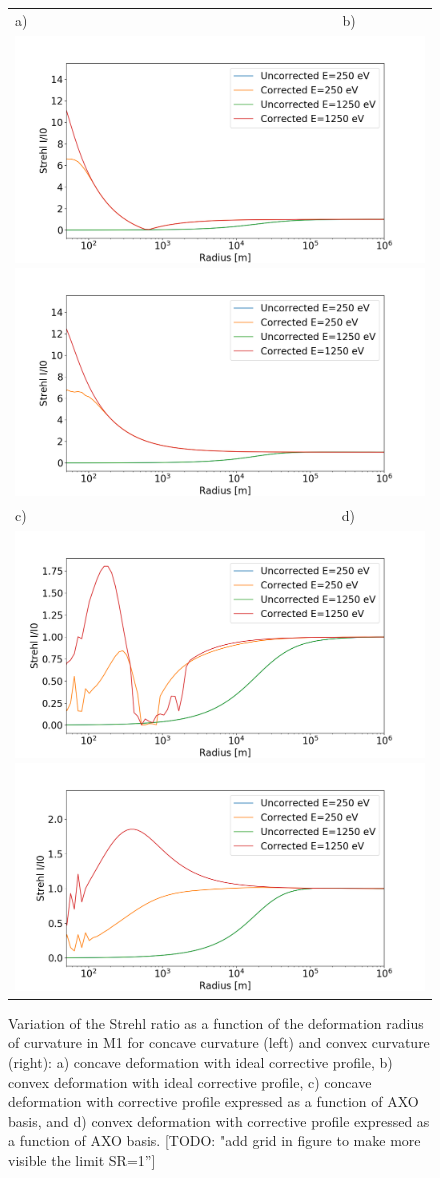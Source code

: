 \documentclass{iucr}              %
\newcommand{\todo}[1]{{\color{red}[TODO: "#1'']}}
\begin{document}
  \begin{figure}
  \begin{center}
  \begin{tabular}{l} 
  a)~~~~~~~~~~~~~~~~~~~~~~~~~~~~~~~~~~~~~~~~~~~~~b) \\
  \includegraphics[height=0.3\textwidth]{figures/flexon_ken_memo2_factor1.png}
    \includegraphics[height=0.3\textwidth]{figures/flexon_ken_memo2_factor-1.png} 
    \\
      c)~~~~~~~~~~~~~~~~~~~~~~~~~~~~~~~~~~~~~~~~~~~~~d) \\
  \includegraphics[height=0.3\textwidth]{figures/flexon_ken_memo2_factor1_fit.png}
  \includegraphics[height=0.3\textwidth]{figures/flexon_ken_memo2_factor-1_fit.png} 
  
  \end{tabular}
  \end{center}
  \caption
  { \label{fig:strehlRatioVersusR} 
Variation of the Strehl ratio as a function of the deformation radius of curvature in M1 for concave curvature (left) and convex curvature (right): a) concave deformation with ideal corrective profile, b) convex deformation with ideal corrective profile, c) concave deformation with corrective profile expressed as a function of AXO basis, and d) convex deformation with corrective profile expressed as a function of AXO basis.
\todo{add grid in figure to make more visible the limit SR=1}}
  \end{figure} 
\end{document}
